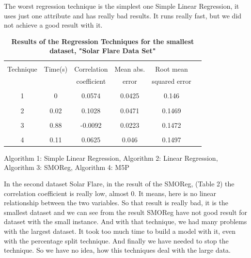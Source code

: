 \documentclass[a4paper]{article}
\begin{document}
The worst regression technique is the simplest one Simple Linear Regression, it uses just one attribute and has really bad results. It runs really fast, but we did not achieve a good result with it.

\begin{table}
\begin{tabular}{| c | c | c |c |c |c |}
\hline & & & & \\
Technique & Time(s) & Correlation & Mean abs.  & Root mean \\
 & & coefficient & error & squared error  \\
\hline & & & &  \\
1  & 0  & 0.0574  & 0.0425 & 0.146 \\ 
\hline & & & & \\
2  & 0.02  &  0.1028 & 0.0471 & 0.1469  \\ 
\hline & & & & \\
3  & 0.88  & -0.0092 & 0.0223 & 0.1472 \\ 
\hline & & & & \\
4  & 0.11  & 0.0625  & 0.046   & 0.1497 \\ 
\hline
\end{tabular}
\caption{\textbf{Results of the Regression Techniques for the smallest dataset,  "Solar Flare Data Set"}}
    Algorithm 1: Simple Linear Regression,
    Algorithm 2: Linear Regression,
    Algorithm 3: SMOReg,
    Algorithm 4: M5P
\end{table}

In the second dataset Solar Flare, in the result of the SMOReg, (Table 2) the correlation coefficient is really low, almost 0. It means, here is no linear relationship between the two variables. So that result is really bad, it is the smallest dataset and we can see from the result SMOReg have not good result for dataset with the small instance. And with that technique, we had many problems with the largest dataset. It took too much time to build a model with it, even with the percentage split technique. And finally we have needed to stop the technique. So we have no idea, how this techniques deal with the large data. 
\end{document}
